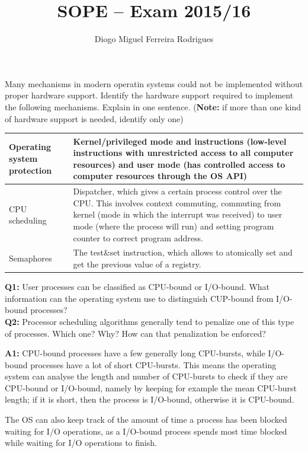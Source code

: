 \documentclass{sope}
\title{SOPE -- Exam 2015/16}
\author{Diogo Miguel Ferreira Rodrigues \\ \email{dmfrodrigues2000@gmail.com}}
\begin{document}
\setcounter{chapter}{15}
Many mechanisms in modern operatin systems could not be implemented without proper hardware support. Identify the hardware support required to implement the following mechanisms. Explain in one sentence. (\textbf{Note:} if more than one kind of hardware support is needed, identify only one)

\ansseparator

\begin{center}
    \begin{tabular}{p{20mm} | p{131mm}}
        Operating system protection & Kernel/privileged mode and instructions (low-level instructions with unrestricted access to all computer resources) and user mode (has controlled access to computer resources through the OS API)\\ \hline
        CPU scheduling & Dispatcher, which gives a certain process control over the CPU. This involves context commuting, commuting from kernel (mode in which the interrupt was received) to user mode (where the process will run) and setting program counter to correct program address. \\ \hline
        Semaphores & The test\&set instruction, which allows to atomically set and get the previous value of a registry.
    \end{tabular}
\end{center}

\textbf{Q1:} User processes can be classified as CPU-bound or I/O-bound. What information can the operating system use to distinguish CUP-bound from I/O-bound processes?\\
\textbf{Q2:} Processor scheduling algorithms generally tend to penalize one of this type of processes. Which one? Why? How can that penalization be enforced?

\ansseparator

\textbf{A1:} CPU-bound processes have a few generally long CPU-bursts, while I/O-bound processes have a lot of short CPU-bursts. This means the operating system can analyse the length and number of CPU-bursts to check if they are CPU-bound or I/O-bound, namely by keeping for example the mean CPU-burst length; if it is short, then the process is I/O-bound, otherwise it is CPU-bound.

The OS can also keep track of the amount of time a process has been blocked waiting for I/O operations, as a I/O-bound process spends most time blocked while waiting for I/O operations to finish.
\end{document}
